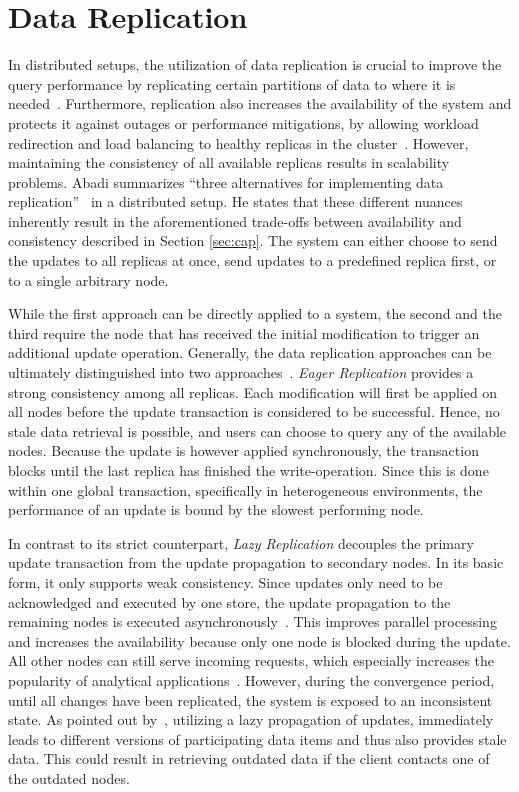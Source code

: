 


\section{Data Replication}

In distributed setups, the utilization of data replication is crucial to improve the query performance
by replicating certain partitions of data to where it is needed~\cite{cloudpart_2012}.
Furthermore, replication also increases the availability of the system and protects it against outages or performance mitigations,
by allowing workload redirection and load balancing to healthy replicas in the cluster~\cite{quorums:2003}.
However, maintaining the consistency of all available replicas results in scalability problems.
Abadi summarizes ``three alternatives for implementing data replication''~\cite{abadi2012} in a distributed setup.
He states that these different nuances inherently result in the aforementioned trade-offs between availability and consistency described in Section \ref{sec:cap}.
The system can either choose to send the updates to all replicas at once, send updates to a predefined replica first, or to a single arbitrary node.

While the first approach can be directly applied to a system, the second and the third require the node that has received the initial modification to trigger an additional update operation.
Generally, the data replication approaches can be ultimately distinguished into two approaches~\cite{gray:1996}.
\emph{Eager Replication} provides a strong consistency among all replicas. Each modification will first be applied on all nodes
before the update transaction is considered to be successful. Hence, no stale data retrieval is possible, and users can choose to query any of the available nodes.
Because the update is however applied synchronously, the transaction blocks until the last replica has finished the write-operation. 
Since this is done within one global transaction, specifically in heterogeneous environments, the performance of an update is bound by the slowest performing node.

In contrast to its strict counterpart, \emph{Lazy Replication} decouples the primary update transaction from the update propagation to secondary nodes.
In its basic form, it only supports weak consistency. Since updates only need to be acknowledged and executed by one store, 
the update propagation to the remaining nodes is executed asynchronously~\cite{fekete:2018}.
This improves parallel processing and increases the availability because only one node is blocked during the update. All other nodes can still serve incoming requests,
which especially increases the popularity of analytical applications~\cite{daudjee:2006}.
However, during the convergence period, until all changes have been replicated, the system is exposed to an inconsistent state.
As pointed out by~\cite{cho:2000}, utilizing a lazy propagation of updates, immediately leads to different versions of participating data items and thus also provides stale data.
This could result in retrieving outdated data if the client contacts one of the outdated nodes.


